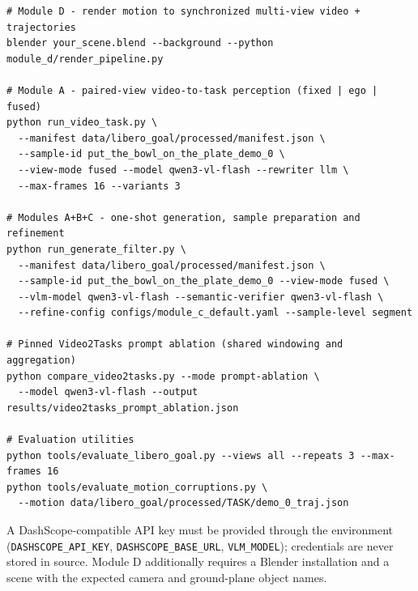 \documentclass[11pt,oneside]{report}
\begin{document}
\begin{lstlisting}
# Module D - render motion to synchronized multi-view video + trajectories
blender your_scene.blend --background --python module_d/render_pipeline.py

# Module A - paired-view video-to-task perception (fixed | ego | fused)
python run_video_task.py \
  --manifest data/libero_goal/processed/manifest.json \
  --sample-id put_the_bowl_on_the_plate_demo_0 \
  --view-mode fused --model qwen3-vl-flash --rewriter llm \
  --max-frames 16 --variants 3

# Modules A+B+C - one-shot generation, sample preparation and refinement
python run_generate_filter.py \
  --manifest data/libero_goal/processed/manifest.json \
  --sample-id put_the_bowl_on_the_plate_demo_0 --view-mode fused \
  --vlm-model qwen3-vl-flash --semantic-verifier qwen3-vl-flash \
  --refine-config configs/module_c_default.yaml --sample-level segment

# Pinned Video2Tasks prompt ablation (shared windowing and aggregation)
python compare_video2tasks.py --mode prompt-ablation \
  --model qwen3-vl-flash --output results/video2tasks_prompt_ablation.json

# Evaluation utilities
python tools/evaluate_libero_goal.py --views all --repeats 3 --max-frames 16
python tools/evaluate_motion_corruptions.py \
  --motion data/libero_goal/processed/TASK/demo_0_traj.json
\end{lstlisting}

\noindent A DashScope-compatible API key must be provided through the environment
(\texttt{DASHSCOPE\_API\_KEY}, \texttt{DASHSCOPE\_BASE\_URL},
\texttt{VLM\_MODEL}); credentials are never stored in source. Module D
additionally requires a Blender installation and a scene with the expected
camera and ground-plane object names.
\end{document}
